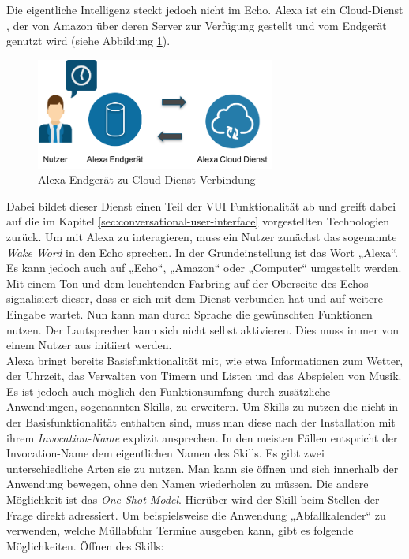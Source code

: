 Die eigentliche Intelligenz steckt jedoch nicht im Echo. Alexa ist ein Cloud-Dienst \cite{amazon-developer-alexa}, der von Amazon über deren Server zur Verfügung gestellt und vom Endgerät genutzt wird (siehe Abbildung \ref{fig:alexa-komponenten}). 

\begin{figure}[!htb]
    \centering
    \includegraphics[width=0.7\textwidth]{bilder/2_alexaDiagram.png}
    \caption{Alexa Endgerät zu Cloud-Dienst Verbindung}
    \label{fig:alexa-komponenten}
\end{figure}

Dabei bildet dieser Dienst einen Teil der \ac{VUI} Funktionalität ab und greift dabei auf die im Kapitel \ref{sec:conversational-user-interface} vorgestellten Technologien zurück. Um mit Alexa zu interagieren, muss ein Nutzer zunächst das sogenannte \textit{Wake Word} in den Echo sprechen. In der Grundeinstellung ist das Wort „Alexa“. Es kann jedoch auch auf „Echo“, „Amazon“ oder „Computer“ umgestellt werden. Mit einem Ton und dem leuchtenden Farbring auf der Oberseite des Echos signalisiert dieser, dass er sich mit dem Dienst verbunden hat und auf weitere Eingabe wartet. Nun kann man durch Sprache die gewünschten Funktionen nutzen. Der Lautsprecher kann sich nicht selbst aktivieren. Dies muss immer von einem Nutzer aus initiiert werden. \\
Alexa bringt bereits Basisfunktionalität mit, wie etwa Informationen zum Wetter, der Uhrzeit, das Verwalten von Timern und Listen und das Abspielen von Musik. Es ist jedoch auch möglich den Funktionsumfang durch zusätzliche Anwendungen, sogenannten Skills, zu erweitern. Um Skills zu nutzen die nicht in der Basisfunktionalität enthalten sind, muss man diese nach der Installation mit ihrem \textit{Invocation-Name} explizit ansprechen. In den meisten Fällen entspricht der Invocation-Name dem eigentlichen Namen des Skills. Es gibt zwei unterschiedliche Arten sie zu nutzen. Man kann sie öffnen und sich innerhalb der Anwendung bewegen, ohne den Namen wiederholen zu müssen. Die andere Möglichkeit ist das \textit{One-Shot-Model}. Hierüber wird der Skill beim Stellen der Frage direkt adressiert. Um beispielsweise die Anwendung „Abfallkalender“ \cite{abfallkalender} zu verwenden, welche Müllabfuhr Termine ausgeben kann, gibt es folgende Möglichkeiten. Öffnen des Skills: 

